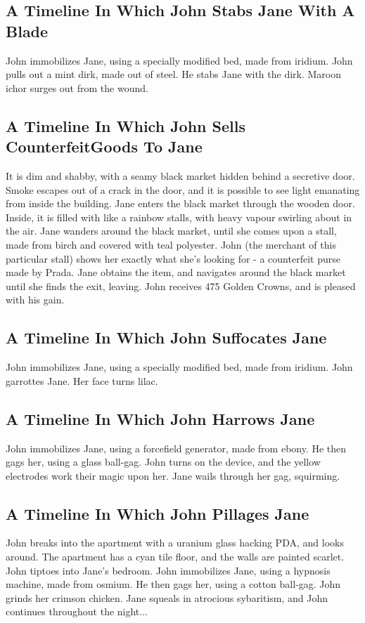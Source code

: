 \documentclass{article}
\begin{document}
\subsection{A Timeline In Which John Stabs Jane With A Blade}


John immobilizes Jane, using a specially modified bed, made from iridium.
John pulls out a mint dirk, made out of steel.
He stabs Jane with the dirk.
Maroon ichor surges out from the wound.
\subsection{A Timeline In Which John Sells CounterfeitGoods To Jane}


It is dim and shabby, with a seamy black market hidden behind a secretive door.
Smoke escapes out of a crack in the door, and it is possible to see light emanating from inside the building.
Jane enters the black market through the wooden door.
Inside, it is filled with like a rainbow stalls, with heavy vapour swirling about in the air.
Jane wanders around the black market, until she comes upon a stall, made from birch and covered with teal polyester.
John (the merchant of this particular stall) shows her exactly what she's looking for {-} a counterfeit purse made by Prada.
Jane obtains the item, and navigates around the black market until she finds the exit, leaving.
John receives 475 Golden Crowns, and is pleased with his gain.
\subsection{A Timeline In Which John Suffocates Jane}


John immobilizes Jane, using a specially modified bed, made from iridium.
John garrottes Jane.
Her face turns lilac.
\subsection{A Timeline In Which John Harrows Jane}


John immobilizes Jane, using a forcefield generator, made from ebony.
He then gags her, using a glass ball{-}gag.
John turns on the device, and the yellow electrodes work their magic upon her.
Jane wails through her gag, squirming.
\subsection{A Timeline In Which John Pillages Jane}


John breaks into the apartment with a uranium glass hacking PDA, and looks around.
The apartment has a cyan tile floor, and the walls are painted scarlet.
John tiptoes into Jane's bedroom.
John immobilizes Jane, using a hypnosis machine, made from osmium.
He then gags her, using a cotton ball{-}gag.
John grinds her crimson chicken.
Jane squeals in atrocious sybaritism, and John continues throughout the night...
\end{document}
